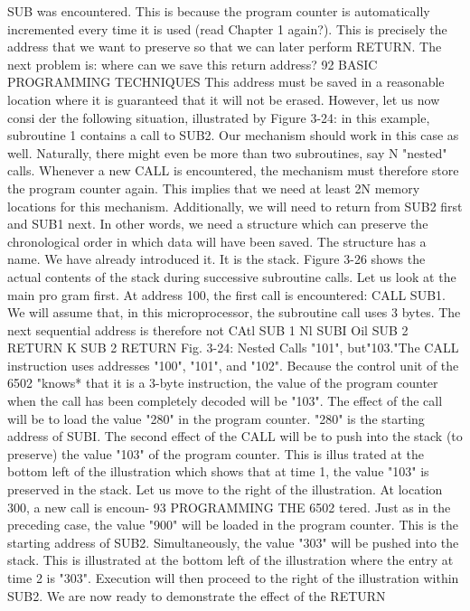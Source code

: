 \documentclass{book}
\begin{document}
SUB was encountered. This is because the program counter is
automatically incremented every time it is used (read Chapter 1
again?). This is precisely the address that we want to preserve so
that we can later perform RETURN.
The next problem is: where can we save this return address?
92
BASIC PROGRAMMING TECHNIQUES
This address must be saved in a reasonable location where it is
guaranteed that it will not be erased. However, let us now consi
der the following situation, illustrated by Figure 3-24: in this
example, subroutine 1 contains a call to SUB2. Our mechanism
should work in this case as well. Naturally, there might even be
more than two subroutines, say N "nested" calls. Whenever a
new CALL is encountered, the mechanism must therefore store
the program counter again. This implies that we need at least 2N
memory locations for this mechanism. Additionally, we will need
to return from SUB2 first and SUB1 next. In other words, we need
a structure which can preserve the chronological order in which
data will have been saved.
The structure has a name. We have already introduced it. It is
the stack. Figure 3-26 shows the actual contents of the stack
during successive subroutine calls. Let us look at the main pro
gram first. At address 100, the first call is encountered: CALL
SUB1. We will assume that, in this microprocessor, the subroutine
call uses 3 bytes. The next sequential address is therefore not
CAtl SUB 1
Nl
SUBI
Oil SUB 2
RETURN K
SUB 2
RETURN
Fig. 3-24: Nested Calls
"101", but"103."The CALL instruction uses addresses "100",
"101", and "102". Because the control unit of the 6502 "knows* that it
is a 3-byte instruction, the value of the program counter when the
call has been completely decoded will be "103". The effect of the
call will be to load the value "280" in the program counter. "280"
is the starting address of SUBI.
The second effect of the CALL will be to push into the stack (to
preserve) the value "103" of the program counter. This is illus
trated at the bottom left of the illustration which shows that at
time 1, the value "103" is preserved in the stack. Let us move to
the right of the illustration. At location 300, a new call is encoun-
93
PROGRAMMING THE 6502
tered. Just as in the preceding case, the value "900" will be
loaded in the program counter. This is the starting address of
SUB2. Simultaneously, the value "303" will be pushed into the
stack. This is illustrated at the bottom left of the illustration
where the entry at time 2 is "303". Execution will then proceed
to the right of the illustration within SUB2.
We are now ready to demonstrate the effect of the RETURN
\end{document}
